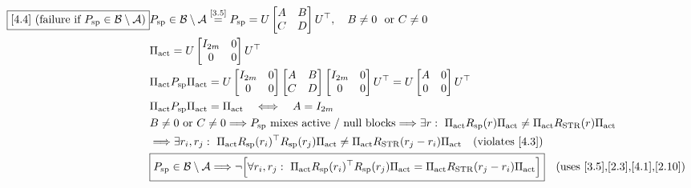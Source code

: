 \documentclass[11pt]{article}
\newcommand{\eqref}[1]{\overset{[#1]}{=}}
\begin{document}
\begin{align}
\boxed{[4.4] \text{ (failure if }P_{\mathrm{sp}}\in\mathcal{B}\setminus\mathcal{A}\text{)}}
&P_{\mathrm{sp}}
\in
\mathcal{B}\setminus\mathcal{A}
\eqref{3.5}
P_{\mathrm{sp}}
=
U
\begin{bmatrix}
A & B\\
C & D
\end{bmatrix}
U^\top,
\quad
B\neq 0
\ \text{ or }
C\neq 0 \notag\\
&\Pi_{\mathrm{act}}
=
U
\begin{bmatrix}
I_{2m} & 0\\
0 & 0
\end{bmatrix}
U^\top \notag\\
&\Pi_{\mathrm{act}}
P_{\mathrm{sp}}
\Pi_{\mathrm{act}}
=
U
\begin{bmatrix}
I_{2m} & 0\\
0 & 0
\end{bmatrix}
\begin{bmatrix}
A & B\\
C & D
\end{bmatrix}
\begin{bmatrix}
I_{2m} & 0\\
0 & 0
\end{bmatrix}
U^\top
=
U
\begin{bmatrix}
A & 0\\
0 & 0
\end{bmatrix}
U^\top \notag\\
&\Pi_{\mathrm{act}}
P_{\mathrm{sp}}
\Pi_{\mathrm{act}}
=
\Pi_{\mathrm{act}}
\quad
\Longleftrightarrow
\quad
A
=
I_{2m} \notag\\
&B\neq 0
\text{ or }
C\neq 0
\Longrightarrow
P_{\mathrm{sp}}
\text{ mixes active / null blocks}
\Longrightarrow
\exists r:\
\Pi_{\mathrm{act}}
R_{\mathrm{sp}}(r)
\Pi_{\mathrm{act}}
\neq
\Pi_{\mathrm{act}}
R_{\mathrm{STR}}(r)
\Pi_{\mathrm{act}} \notag\\
&\Longrightarrow
\exists r_i,r_j:\
\Pi_{\mathrm{act}}
R_{\mathrm{sp}}(r_i)^\top
R_{\mathrm{sp}}(r_j)
\Pi_{\mathrm{act}}
\neq
\Pi_{\mathrm{act}}
R_{\mathrm{STR}}(r_j-r_i)
\Pi_{\mathrm{act}}
\quad
(\text{violates [4.3]}) \notag\\
&\boxed{
P_{\mathrm{sp}}
\in
\mathcal{B}\setminus\mathcal{A}
\Longrightarrow
\neg
\Big[
\forall r_i,r_j:\
\Pi_{\mathrm{act}}
R_{\mathrm{sp}}(r_i)^\top
R_{\mathrm{sp}}(r_j)
\Pi_{\mathrm{act}}
=
\Pi_{\mathrm{act}}
R_{\mathrm{STR}}(r_j-r_i)
\Pi_{\mathrm{act}}
\Big]
}
\quad(\text{uses [3.5],[2.3],[4.1],[2.10]})
\end{align}
\end{document}
